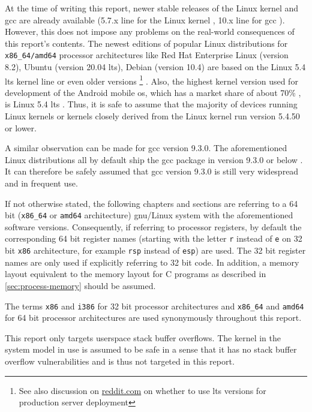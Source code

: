 At the time of writing this report, newer stable releases of the Linux kernel and \gls{gcc} are already available (5.7.x line for the Linux kernel \cite{LKO2020a}, 10.x line for \gls{gcc} \cite{FSF2020}).
However, this does not impose any problems on the real-world consequences of this report's contents.
The newest editions of popular Linux distributions for \texttt{x86\_64/amd64} processor architectures like Red Hat Enterprise Linux (version 8.2), Ubuntu (version 20.04 \gls{lts}), Debian (version 10.4) are based on the Linux 5.4 \gls{lts} kernel line or even older versions%
\footnote{See also discussion on \href{https://www.reddit.com/r/webhosting/comments/beg0z0/should_i_use_an_lts_version_of_ubuntu_for_my_web/}{reddit.com} on whether to use \gls{lts} versions for production server deployment}
\cite{RedHat2020,Canonical2020,SPI2020,SPI2020a}.
Also, the highest kernel version used for development of the Android mobile \gls{os}, which has a market share of about 70\% \cite{Statcounter2020}, is Linux 5.4 \gls{lts} \cite{GoogleLLC2020}.
Thus, it is safe to assume that the majority of devices running Linux kernels or kernels closely derived from the Linux kernel run version 5.4.50 or lower.

A similar observation can be made for \gls{gcc} version 9.3.0.
The aforementioned Linux distributions all by default ship the \gls{gcc} package in version 9.3.0 or below \cite{RedHat2020a,Canonical2020a,SPI2020b}.
It can therefore be safely assumed that \gls{gcc} version 9.3.0 is still very widespread and in frequent use.

If not otherwise stated, the following chapters and sections are referring to a 64 bit (\texttt{x86\_64} or \texttt{amd64} architecture) \acs{gnu}/Linux system with the aforementioned software versions.
Consequently, if referring to processor registers, by default the corresponding 64 bit register names (starting with the letter \texttt{r} instead of \texttt{e} on 32 bit \texttt{x86} architecture, for example \texttt{rsp} instead of \texttt{esp}) are used.
The 32 bit register names are only used if explicitly referring to 32 bit code.
In addition, a memory layout equivalent to the memory layout for C programs as described in \cref{sec:process-memory} should be assumed.

The terms \texttt{x86} and \texttt{i386} for 32 bit processor architectures and \texttt{x86\_64} and \texttt{amd64} for 64 bit processor architectures are used synonymously throughout this report.

This report only targets userspace stack buffer overflows.
The kernel in the system model in use is assumed to be safe in a sense that it has no stack buffer overflow vulnerabilities and is thus not targeted in this report.


